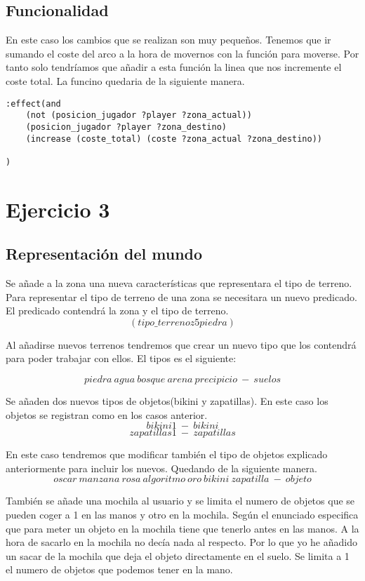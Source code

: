 \documentclass[]{article}
\begin{document}
\subsection{Funcionalidad}
En este caso los cambios que se realizan son muy pequeños. Tenemos que ir sumando el coste del arco a la hora de movernos con la función para moverse. Por tanto solo tendríamos que añadir a esta función la linea que nos incremente el coste total. La funcino quedaria de la siguiente manera. 

\begin{lstlisting}
:effect(and 
	(not (posicion_jugador ?player ?zona_actual))
	(posicion_jugador ?player ?zona_destino)
	(increase (coste_total) (coste ?zona_actual ?zona_destino))

)
\end{lstlisting}

\section{Ejercicio 3}
\subsection{Representación del mundo}
Se añade a la zona una nueva características que representara el tipo de terreno. Para representar el tipo de terreno de una zona se necesitara un nuevo predicado. El predicado contendrá la zona y el tipo de terreno. 
$$
(tipo\_terreno z5 piedra)
$$

Al añadirse nuevos terrenos tendremos que crear un nuevo tipo que los contendrá para poder trabajar con ellos. El tipos es el siguiente: 

$$
piedra\ agua\ bosque\ arena\ precipicio\ -\ suelos
$$

Se añaden dos nuevos tipos de objetos(bikini y zapatillas). En este caso los objetos se registran como en los casos anterior. 
$$
bikini1\ -\ bikini
$$
$$
zapatillas1\ -\ zapatillas
$$

En este caso tendremos que modificar también el tipo de objetos explicado anteriormente para incluir los nuevos. Quedando de la siguiente manera.
$$
oscar\ manzana\ rosa\ algoritmo\ oro\ bikini\ zapatilla\ -\ objeto
$$

También se añade una mochila al usuario y se limita el numero de objetos que se pueden coger a 1 en las manos y otro en la mochila. Según el enunciado especifica que para meter un objeto en la mochila tiene que tenerlo antes en las manos. A la hora de sacarlo en la mochila no decía nada al respecto. Por lo que yo he añadido un sacar de la mochila que deja el objeto directamente en el suelo. Se limita a 1 el numero de objetos que podemos tener en la mano. 
\end{document}
